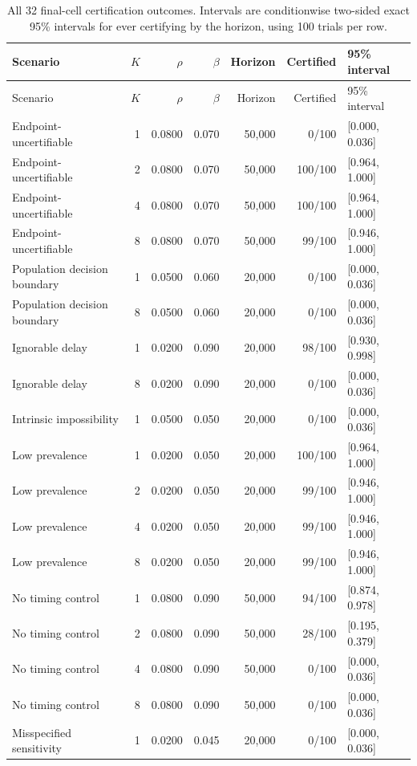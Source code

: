 \small\begin{longtable}{lrrrrrl}\caption{All 32 final-cell certification outcomes. Intervals are conditionwise two-sided exact 95\% intervals for ever certifying by the horizon, using 100 trials per row.}\label{tab:allpower}\\\toprule Scenario & $K$ & $\rho$ & $\beta$ & Horizon & Certified & 95\% interval\\\midrule\endfirsthead\toprule Scenario & $K$ & $\rho$ & $\beta$ & Horizon & Certified & 95\% interval\\\midrule\endhead
Endpoint-uncertifiable & 1 & 0.0800 & 0.070 & 50,000 & 0/100 & [0.000, 0.036]\\
Endpoint-uncertifiable & 2 & 0.0800 & 0.070 & 50,000 & 100/100 & [0.964, 1.000]\\
Endpoint-uncertifiable & 4 & 0.0800 & 0.070 & 50,000 & 100/100 & [0.964, 1.000]\\
Endpoint-uncertifiable & 8 & 0.0800 & 0.070 & 50,000 & 99/100 & [0.946, 1.000]\\
Population decision boundary & 1 & 0.0500 & 0.060 & 20,000 & 0/100 & [0.000, 0.036]\\
Population decision boundary & 8 & 0.0500 & 0.060 & 20,000 & 0/100 & [0.000, 0.036]\\
Ignorable delay & 1 & 0.0200 & 0.090 & 20,000 & 98/100 & [0.930, 0.998]\\
Ignorable delay & 8 & 0.0200 & 0.090 & 20,000 & 0/100 & [0.000, 0.036]\\
Intrinsic impossibility & 1 & 0.0500 & 0.050 & 20,000 & 0/100 & [0.000, 0.036]\\
Low prevalence & 1 & 0.0200 & 0.050 & 20,000 & 100/100 & [0.964, 1.000]\\
Low prevalence & 2 & 0.0200 & 0.050 & 20,000 & 99/100 & [0.946, 1.000]\\
Low prevalence & 4 & 0.0200 & 0.050 & 20,000 & 99/100 & [0.946, 1.000]\\
Low prevalence & 8 & 0.0200 & 0.050 & 20,000 & 99/100 & [0.946, 1.000]\\
No timing control & 1 & 0.0800 & 0.090 & 50,000 & 94/100 & [0.874, 0.978]\\
No timing control & 2 & 0.0800 & 0.090 & 50,000 & 28/100 & [0.195, 0.379]\\
No timing control & 4 & 0.0800 & 0.090 & 50,000 & 0/100 & [0.000, 0.036]\\
No timing control & 8 & 0.0800 & 0.090 & 50,000 & 0/100 & [0.000, 0.036]\\
Misspecified sensitivity & 1 & 0.0200 & 0.045 & 20,000 & 0/100 & [0.000, 0.036]\\

\end{longtable}
